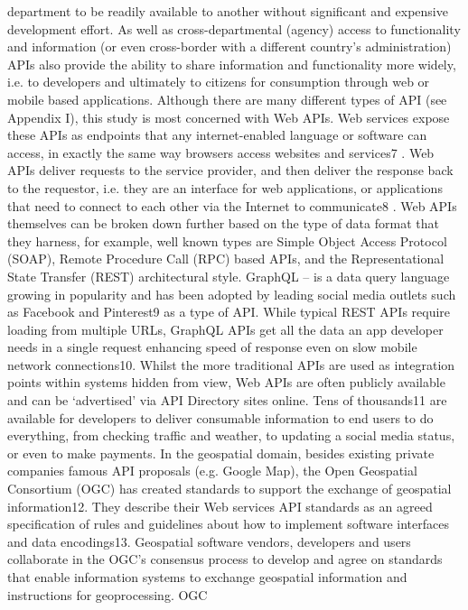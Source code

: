 department to be readily available to another without significant and expensive development effort. As well
as cross-departmental (agency) access to functionality and information (or even cross-border with a
different country’s administration) APIs also provide the ability to share information and functionality more
widely, i.e. to developers and ultimately to citizens for consumption through web or mobile based
applications.
Although there are many different types of API (see Appendix I), this study is most concerned with Web
APIs. Web services expose these APIs as endpoints that any internet-enabled language or software can
access, in exactly the same way browsers access websites and services7
. Web APIs deliver requests to the
service provider, and then deliver the response back to the requestor, i.e. they are an interface for web
applications, or applications that need to connect to each other via the Internet to communicate8
.
Web APIs themselves can be broken down further based on the type of data format that they harness, for
example, well known types are Simple Object Access Protocol (SOAP), Remote Procedure Call (RPC)
based APIs, and the Representational State Transfer (REST) architectural style. GraphQL – is a data query
language growing in popularity and has been adopted by leading social media outlets such as Facebook
and Pinterest9 as a type of API. While typical REST APIs require loading from multiple URLs, GraphQL
APIs get all the data an app developer needs in a single request enhancing speed of response even on
slow mobile network connections10.
Whilst the more traditional APIs are used as integration points within systems hidden from view, Web APIs
are often publicly available and can be ‘advertised’ via API Directory sites online. Tens of thousands11 are
available for developers to deliver consumable information to end users to do everything, from checking
traffic and weather, to updating a social media status, or even to make payments.
In the geospatial domain, besides existing private companies famous API proposals (e.g. Google Map), the
Open Geospatial Consortium (OGC) has created standards to support the exchange of geospatial
information12. They describe their Web services API standards as an agreed specification of rules and
guidelines about how to implement software interfaces and data encodings13. Geospatial software vendors,
developers and users collaborate in the OGC’s consensus process to develop and agree on standards that
enable information systems to exchange geospatial information and instructions for geoprocessing. OGC
